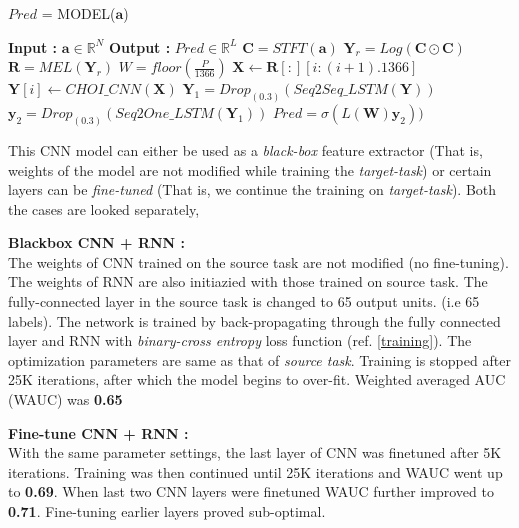 \begin{algorithm}
  \caption{$Pred$ = MODEL($\textbf{a}$) }
  \label{alg:cnnrnn}
  {\fontsize{1}{0}
  \begin{algorithmic}[1]
    \Statex \textbf{Input :} $\textbf{a} \in \mathbb{R}^{N}$
    \Statex \textbf{Output :} $Pred \in \mathbb{R}^{L}$ 
    \State $\textbf{C} = STFT(\textbf{a})$ 
    \State $\textbf{Y}_{r} = Log(\textbf{C} \odot \textbf{C})$ 
    \State $\textbf{R} = MEL(\textbf{Y}_{r})$ 
    \State $W = floor(\frac{P}{1366})$
      \State $\textbf{X} \leftarrow \textbf{R}[:][i:(i+1).1366]$ 
      \State $\textbf{Y}[i] \leftarrow CHOI\_CNN(\textbf{X})$  
    \EndFor
    \State $\textbf{Y}_{1} = Drop_{(0.3)}(Seq2Seq\_LSTM(\textbf{Y}))$ 
    \State $\textbf{y}_{2} = Drop_{(0.3)}(Seq2One\_LSTM(\textbf{Y}_{1}))$ 
    \State $Pred = \sigma(L(\textbf{W})\textbf{y}_{2}))$ 
  \end{algorithmic}
  }
\end{algorithm}
\FloatBarrier

\noindent This CNN model can either be used as a \textit{black-box} feature extractor (That is, weights of the model are not modified while training the \textit{target-task}) or certain layers can be \textit{fine-tuned} (That is, we continue the training on \textit{target-task}). Both the cases are looked separately,
\bigskip

\noindent \textbf{Blackbox CNN + RNN :}\\ 
The weights of CNN trained on the source task are not modified (no fine-tuning). The weights of RNN are also initiazied with those trained on source task. The fully-connected layer in the source task is changed to 65 output units. (i.e 65 labels). The network is trained by back-propagating through the fully connected layer and RNN with \textit{binary-cross entropy} loss function (ref. \ref{training}). The optimization parameters are same as that of \textit{source task}. Training is stopped after 25K iterations, after which the model begins to over-fit. Weighted averaged AUC (WAUC) was \textbf{0.65}
\bigskip

\noindent \textbf{Fine-tune CNN + RNN :}\\
With the same parameter settings, the last layer of CNN was finetuned after 5K iterations. Training was then continued until 25K iterations and WAUC went up to \textbf{0.69}. When last two CNN layers were finetuned WAUC further improved to \textbf{0.71}. Fine-tuning earlier layers proved sub-optimal. 
\bigskip

